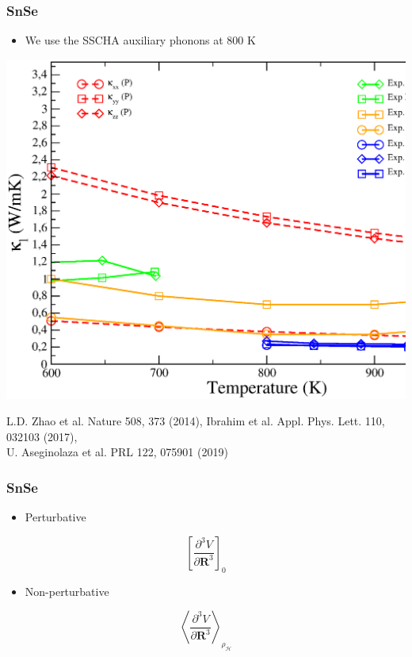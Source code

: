 \documentclass{beamer}
\begin{document}
\begin{frame}

\frametitle{SnSe}
\begin{itemize}
 \item We use the SSCHA auxiliary phonons at $800$ K
\end{itemize}
\vspace{-0.3cm}
\begin{center}
 \includegraphics[width=0.75\linewidth]{Pictures/SnSe/tk-SnSe1.eps}
\end{center}
\vspace{-0.3cm}
\begin{tiny}
 L.D. Zhao et al. Nature 508, 373 (2014),
 Ibrahim et al. Appl. Phys. Lett. 110, 032103 (2017), \\
 U. Aseginolaza et al. PRL 122, 075901 (2019)
\end{tiny}

\end{frame}


\begin{frame}

\frametitle{SnSe}
\begin{itemize}
 \item Perturbative
\end{itemize}
\begin{huge}
\begin{equation}
 \nonumber
 \left[\frac{\partial^{3}V}{\partial\boldsymbol{R}^{3}}\right]_{0}
\end{equation}
\end{huge}
\begin{itemize}
 \item Non-perturbative
\end{itemize}
\begin{huge}
\begin{equation}
 \nonumber
 \left\langle\frac{\partial^{3}V}{\partial\boldsymbol{R}^{3}}\right\rangle_{\rho_{\mathcal{H}}}
\end{equation}
\end{huge}

\end{frame}
\end{document}
